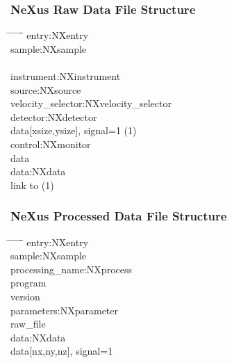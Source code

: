 \documentclass{beamer}
\begin{document}
\begin{frame} \frametitle{NeXus Raw Data File Structure}
\begin{tabbing}
\hspace*{1cm} \= \hspace*{1cm} \= \hspace*{1cm} \= \hspace*{1cm} \= \hspace*{1cm} \= \hspace*{1cm}\= \kill
entry:NXentry \\
 \>sample:NXsample \\
\\
 \>instrument:NXinstrument\\
 \> \> source:NXsource\\
 \> \> velocity\_selector:NXvelocity\_selector\\
 \> \> detector:NXdetector \\
 \> \> \>data[xsize,ysize], signal=1 (1)\\
 \>control:NXmonitor\\
 \> \>data\\
 \>data:NXdata\\
 \> \> link to (1)\\
\end{tabbing}
\end{frame}

\begin{frame} \frametitle{NeXus Processed Data File Structure}
\begin{tabbing}
\hspace*{1cm} \= \hspace*{1cm} \= \hspace*{1cm} \= \hspace*{1cm} \= \hspace*{1cm} \= \hspace*{1cm}\= \kill
entry:NXentry \\
 \>sample:NXsample \\
 \>processing\_name:NXprocess\\
 \> \>program \\
 \> \>version \\
 \> \>parameters:NXparameter \\
 \> \> \>raw\_file \\
 \>data:NXdata\\
 \> \> data[nx,ny,nz], signal=1\\
\end{tabbing}
\end{frame}
\end{document}
